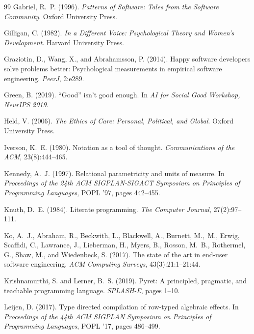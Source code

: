 \documentclass[11pt,a4paper]{article}
\begin{document}
\begin{thebibliography}{99}
Gabriel, R.~P. (1996).
\newblock \emph{Patterns of Software: Tales from the Software Community}.
\newblock Oxford University Press.

Gilligan, C. (1982).
\newblock \emph{In a Different Voice: Psychological Theory and Women's
  Development}.
\newblock Harvard University Press.

Graziotin, D., Wang, X., and Abrahamsson, P. (2014).
\newblock Happy software developers solve problems better: Psychological
  measurements in empirical software engineering.
\newblock \emph{PeerJ}, 2:e289.

Green, B. (2019).
\newblock ``{Good}'' isn't good enough.
\newblock In \emph{AI for Social Good Workshop, NeurIPS 2019}.

Held, V. (2006).
\newblock \emph{The Ethics of Care: Personal, Political, and Global}.
\newblock Oxford University Press.

Iverson, K.~E. (1980).
\newblock Notation as a tool of thought.
\newblock \emph{Communications of the ACM}, 23(8):444--465.

Kennedy, A.~J. (1997).
\newblock Relational parametricity and units of measure.
\newblock In \emph{Proceedings of the 24th ACM SIGPLAN-SIGACT Symposium on
  Principles of Programming Languages}, POPL '97, pages 442--455.

Knuth, D.~E. (1984).
\newblock Literate programming.
\newblock \emph{The Computer Journal}, 27(2):97--111.

Ko, A.~J., Abraham, R., Beckwith, L., Blackwell, A., Burnett, M.,~M., Erwig,
  Scaffidi, C., Lawrance, J., Lieberman, H., Myers, B., Rosson, M.~B.,
  Rothermel, G., Shaw, M., and Wiedenbeck, S. (2017).
\newblock The state of the art in end-user software engineering.
\newblock \emph{ACM Computing Surveys}, 43(3):21:1--21:44.

Krishnamurthi, S. and Lerner, B.~S. (2019).
\newblock Pyret: A principled, pragmatic, and teachable programming language.
\newblock \emph{SPLASH-E}, pages 1--10.

Leijen, D. (2017).
\newblock Type directed compilation of row-typed algebraic effects.
\newblock In \emph{Proceedings of the 44th ACM SIGPLAN Symposium on Principles
  of Programming Languages}, POPL '17, pages 486--499.


\end{thebibliography}
\end{document}
